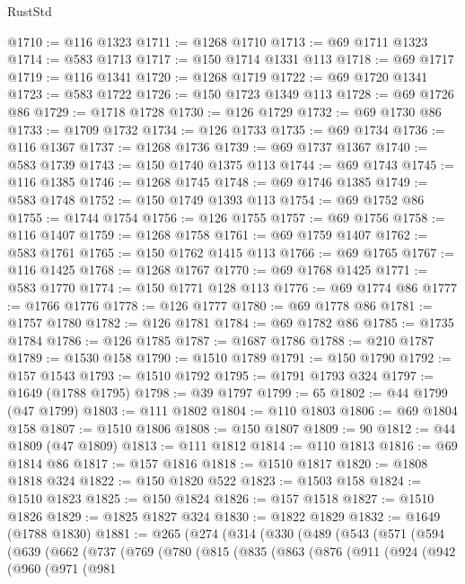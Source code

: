 \begin{lexlean}{RustStd}
\begin{coremodule}
@1710 := @116 @1323
@1711 := @1268 @1710
@1713 := @69 @1711 @1323
@1714 := @583 @1713
@1717 := @150 @1714 @1331 @113
@1718 := @69 @1717
@1719 := @116 @1341
@1720 := @1268 @1719
@1722 := @69 @1720 @1341
@1723 := @583 @1722
@1726 := @150 @1723 @1349 @113
@1728 := @69 @1726 @86
@1729 := @1718 @1728
@1730 := @126 @1729
@1732 := @69 @1730 @86
@1733 := @1709 @1732
@1734 := @126 @1733
@1735 := @69 @1734
@1736 := @116 @1367
@1737 := @1268 @1736
@1739 := @69 @1737 @1367
@1740 := @583 @1739
@1743 := @150 @1740 @1375 @113
@1744 := @69 @1743
@1745 := @116 @1385
@1746 := @1268 @1745
@1748 := @69 @1746 @1385
@1749 := @583 @1748
@1752 := @150 @1749 @1393 @113
@1754 := @69 @1752 @86
@1755 := @1744 @1754
@1756 := @126 @1755
@1757 := @69 @1756
@1758 := @116 @1407
@1759 := @1268 @1758
@1761 := @69 @1759 @1407
@1762 := @583 @1761
@1765 := @150 @1762 @1415 @113
@1766 := @69 @1765
@1767 := @116 @1425
@1768 := @1268 @1767
@1770 := @69 @1768 @1425
@1771 := @583 @1770
@1774 := @150 @1771 @128 @113
@1776 := @69 @1774 @86
@1777 := @1766 @1776
@1778 := @126 @1777
@1780 := @69 @1778 @86
@1781 := @1757 @1780
@1782 := @126 @1781
@1784 := @69 @1782 @86
@1785 := @1735 @1784
@1786 := @126 @1785
@1787 := @1687 @1786
@1788 := @210 @1787
@1789 := @1530 @158
@1790 := @1510 @1789
@1791 := @150 @1790
@1792 := @157 @1543
@1793 := @1510 @1792
@1795 := @1791 @1793 @324
@1797 := @1649 (@1788 @1795)
@1798 := @39 @1797
@1799 := 65
@1802 := @44 @1799 (@47 @1799)
@1803 := @111 @1802
@1804 := @110 @1803
@1806 := @69 @1804 @158
@1807 := @1510 @1806
@1808 := @150 @1807
@1809 := 90
@1812 := @44 @1809 (@47 @1809)
@1813 := @111 @1812
@1814 := @110 @1813
@1816 := @69 @1814 @86
@1817 := @157 @1816
@1818 := @1510 @1817
@1820 := @1808 @1818 @324
@1822 := @150 @1820 @522
@1823 := @1503 @158
@1824 := @1510 @1823
@1825 := @150 @1824
@1826 := @157 @1518
@1827 := @1510 @1826
@1829 := @1825 @1827 @324
@1830 := @1822 @1829
@1832 := @1649 (@1788 @1830)
@1881 := @265
    (@274
      (@314
        (@330
          (@489
            (@543
              (@571
                (@594
                  (@639
                    (@662
                      (@737
                        (@769
                          (@780
                            (@815
                              (@835
                                (@863
                                  (@876
                                    (@911
                                      (@924
                                        (@942
                                          (@960
                                            (@971
                                              (@981

\end{coremodule}
\end{lexlean}
